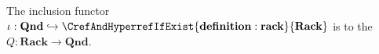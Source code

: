 \begin{proposition} \label{proposition:quandleization_fucntor_is_left_adjoint_to_inclusion_of_category_of_quandles_in_racks}
    The inclusion functor $\iota: \mathbf{Qnd} \hookrightarrow \mathbf{\CrefAndHyperrefIfExist{definition:rack}{Rack}}$ is   to the  $Q: \mathbf{Rack} \to \mathbf{Qnd}$. 
\end{proposition}